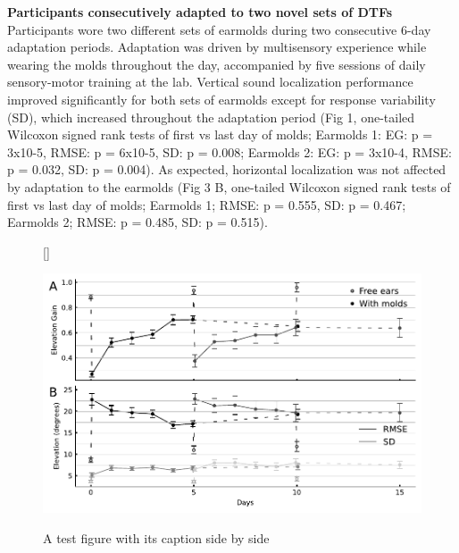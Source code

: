 \begin{multicols}{2}
 \noindent\textbf{Participants consecutively adapted to two novel sets of DTFs}\\
Participants wore two different sets of earmolds during two consecutive 6-day adaptation periods. Adaptation was driven by multisensory experience while wearing the molds throughout the day, accompanied by five sessions of daily sensory-motor training at the lab. Vertical sound localization performance improved significantly for both sets of earmolds except for response variability (SD), which increased throughout the adaptation period (Fig 1, one-tailed Wilcoxon signed rank tests of first vs last day of molds; Earmolds 1: EG: p = 3x10-5, RMSE: p = 6x10-5, SD: p = 0.008; Earmolds 2: EG: p = 3x10-4, RMSE: p = 0.032, SD: p = 0.004). As expected, horizontal localization was not affected by adaptation to the earmolds (Fig 3 B, one-tailed Wilcoxon signed rank tests of first vs last day of molds; Earmolds 1; RMSE: p = 0.555, SD: p = 0.467; Earmolds 2; RMSE: p = 0.485, SD: p = 0.515).\\

\end{multicols} %
\begin{figure}[hb]
[\FBwidth]
{\caption{A test figure with its caption side by side}\label{fig:test}}
{\includegraphics[width=13cm]{../Results/figures/ele_learning/ele_learning}}
\end{figure}
